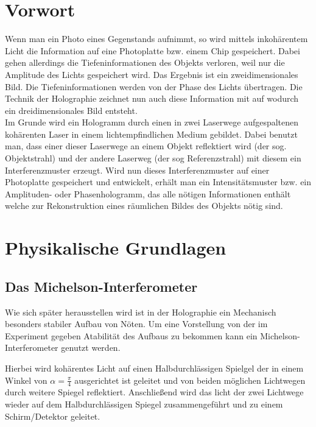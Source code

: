 \section{Vorwort}
Wenn man ein Photo eines Gegenstands aufnimmt, so wird mittels inkohärentem Licht die Information auf eine Photoplatte bzw. einem Chip gespeichert. Dabei gehen allerdings die Tiefeninformationen des Objekts verloren, weil nur die Amplitude des Lichts gespeichert wird. Das Ergebnis ist ein zweidimensionales Bild. Die Tiefeninformationen werden von der Phase des Lichts übertragen. Die Technik der Holographie zeichnet nun auch diese Information mit auf wodurch ein dreidimensionales Bild entsteht.\\

Im Grunde wird ein Hologramm durch einen in zwei Laserwege aufgespaltenen kohärenten Laser in einem lichtempfindlichen Medium gebildet. Dabei benutzt man, dass einer dieser Laserwege an einem Objekt reflektiert wird (der sog. Objektstrahl) und der andere Laserweg (der sog Referenzstrahl) mit diesem ein Interferenzmuster erzeugt.
Wird nun dieses Interferenzmuster auf einer Photoplatte gespeichert und entwickelt, erhält man ein Intensitätsmuster bzw. ein Amplituden- oder Phasenhologramm, das alle nötigen Informationen enthält welche zur Rekonstruktion eines räumlichen Bildes des Objekts nötig sind.

\section{Physikalische Grundlagen}

\subsection{Das Michelson-Interferometer}
Wie sich später herausstellen wird ist in der Holographie ein Mechanisch besonders stabiler Aufbau von Nöten. Um eine Vorstellung von der im Experiment gegeben Atabilität des Aufbaus zu bekommen kann ein Michelson-Interferometer genutzt werden. 

Hierbei wird kohärentes Licht auf einen Halbdurchlässigen Spielgel der in einem Winkel von $\alpha = \frac{\pi}{4}$ ausgerichtet ist geleitet und von beiden möglichen Lichtwegen durch weitere Spiegel reflektiert. Anschließend wird das licht der zwei Lichtwege wieder auf dem Halbdurchlässigen Spiegel zusammengeführt und zu einem Schirm/Detektor geleitet.


